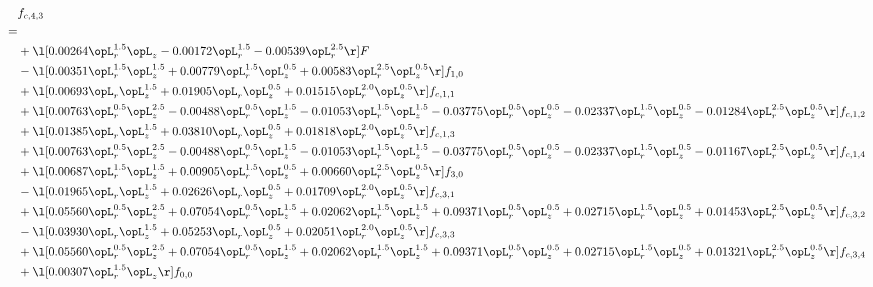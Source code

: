 \begin{alignat}{2} 
\label{eq:f_43_1} 
& f_{c,4,3} \nonumber \\ 
 = \\ 
& + \l[  0.00264 \opL_r^{1.5} \opL_z   -0.00172 \opL_r^{1.5}   -0.00539 \opL_r^{2.5}  \r] F \nonumber \\ 
& - \l[  0.00351 \opL_r^{1.5} \opL_z^{1.5} +  0.00779 \opL_r^{1.5} \opL_z^{0.5} +  0.00583 \opL_r^{2.5} \opL_z^{0.5}  \r] f_{1,0} \nonumber \\ 
& + \l[  0.00693 \opL_r \opL_z^{1.5} +  0.01905 \opL_r \opL_z^{0.5} +  0.01515 \opL_r^{2.0} \opL_z^{0.5}  \r] f_{c,1,1} \nonumber \\ 
& + \l[  0.00763 \opL_r^{0.5} \opL_z^{2.5}   -0.00488 \opL_r^{0.5} \opL_z^{1.5}   -0.01053 \opL_r^{1.5} \opL_z^{1.5}   -0.03775 \opL_r^{0.5} \opL_z^{0.5}   -0.02337 \opL_r^{1.5} \opL_z^{0.5}   -0.01284 \opL_r^{2.5} \opL_z^{0.5}  \r] f_{c,1,2} \nonumber \\ 
& + \l[  0.01385 \opL_r \opL_z^{1.5} +  0.03810 \opL_r \opL_z^{0.5} +  0.01818 \opL_r^{2.0} \opL_z^{0.5}  \r] f_{c,1,3} \nonumber \\ 
& + \l[  0.00763 \opL_r^{0.5} \opL_z^{2.5}   -0.00488 \opL_r^{0.5} \opL_z^{1.5}   -0.01053 \opL_r^{1.5} \opL_z^{1.5}   -0.03775 \opL_r^{0.5} \opL_z^{0.5}   -0.02337 \opL_r^{1.5} \opL_z^{0.5}   -0.01167 \opL_r^{2.5} \opL_z^{0.5}  \r] f_{c,1,4} \nonumber \\ 
& + \l[  0.00687 \opL_r^{1.5} \opL_z^{1.5} +  0.00905 \opL_r^{1.5} \opL_z^{0.5} +  0.00660 \opL_r^{2.5} \opL_z^{0.5}  \r] f_{3,0} \nonumber \\ 
& - \l[  0.01965 \opL_r \opL_z^{1.5} +  0.02626 \opL_r \opL_z^{0.5} +  0.01709 \opL_r^{2.0} \opL_z^{0.5}  \r] f_{c,3,1} \nonumber \\ 
& + \l[  0.05560 \opL_r^{0.5} \opL_z^{2.5} +  0.07054 \opL_r^{0.5} \opL_z^{1.5} +  0.02062 \opL_r^{1.5} \opL_z^{1.5} +  0.09371 \opL_r^{0.5} \opL_z^{0.5} +  0.02715 \opL_r^{1.5} \opL_z^{0.5} +  0.01453 \opL_r^{2.5} \opL_z^{0.5}  \r] f_{c,3,2} \nonumber \\ 
& - \l[  0.03930 \opL_r \opL_z^{1.5} +  0.05253 \opL_r \opL_z^{0.5} +  0.02051 \opL_r^{2.0} \opL_z^{0.5}  \r] f_{c,3,3} \nonumber \\ 
& + \l[  0.05560 \opL_r^{0.5} \opL_z^{2.5} +  0.07054 \opL_r^{0.5} \opL_z^{1.5} +  0.02062 \opL_r^{1.5} \opL_z^{1.5} +  0.09371 \opL_r^{0.5} \opL_z^{0.5} +  0.02715 \opL_r^{1.5} \opL_z^{0.5} +  0.01321 \opL_r^{2.5} \opL_z^{0.5}  \r] f_{c,3,4} \nonumber \\ 
& + \l[  0.00307 \opL_r^{1.5} \opL_z  \r] f_{0,0} \nonumber \\ 

\end{alignat}
